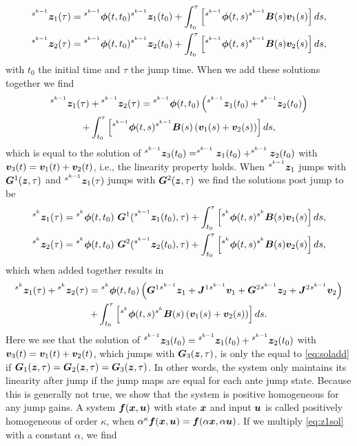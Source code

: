 \documentclass[../DC2017114Bouma.tex]{subfiles}
\begin{document}
\begin{align}
\hspace{0cm}^{s^{k-1}}{\boldsymbol{z}}_1(\tau) &= \hspace{0cm}^{s^{k-1}}\boldsymbol{\phi}(t,t_0)\hspace{0cm}^{s^{k-1}}{\boldsymbol{z}}_1(t_0) + \int_{t_0}^\tau \left[\hspace{0cm}^{s^{k-1}}\boldsymbol{\phi}(t,s)\hspace{0cm}^{s^{k-1}}{\boldsymbol{B}}(s){\boldsymbol{v}}_1(s)\right]ds,\\
\hspace{0cm}^{s^{k-1}}{\boldsymbol{z}}_2(\tau) &= \hspace{0cm}^{s^{k-1}}\boldsymbol{\phi}(t,t_0)\hspace{0cm}^{s^{k-1}}{\boldsymbol{z}}_2(t_0) + \int_{t_0}^\tau \left[\hspace{0cm}^{s^{k-1}}\boldsymbol{\phi}(t,s)\hspace{0cm}^{s^{k-1}}{\boldsymbol{B}}(s){\boldsymbol{v}}_2(s)\right]ds,
\end{align}
with $t_0$ the initial time and $\tau$ the jump time.
When we add these solutions together we find
\begin{multline}
^{s^{k-1}}{\boldsymbol{z}}_1(\tau) + \hspace{0cm}^{s^{k-1}}{\boldsymbol{z}}_2(\tau) = \hspace{0cm}^{s^{k-1}}\boldsymbol{\phi}(t,t_0)\left(\hspace{0cm}^{s^{k-1}}{\boldsymbol{z}}_1(t_0) + \hspace{0cm}^{s^{k-1}}{\boldsymbol{z}}_2(t_0)\right) \\+ \int_{t_0}^\tau \left[\hspace{0cm}^{s^{k-1}}\boldsymbol{\phi}(t,s)\hspace{0cm}^{s^{k-1}}{\boldsymbol{B}}(s)\left({\boldsymbol{v}}_1(s) + {\boldsymbol{v}}_2(s)\right)\right]ds,
\end{multline}
which is equal to the solution of $^{s^{k-1}}{\boldsymbol{z}}_3(t_0) = ^{s^{k-1}}{\boldsymbol{z}}_1(t_0) + ^{s^{k-1}}{\boldsymbol{z}}_2(t_0)$ with ${\boldsymbol{v}}_3(t) = {\boldsymbol{v}}_1(t) + {\boldsymbol{v}}_2(t)$, i.e., the linearity property holds. When $^{s^{k-1}}{\boldsymbol{z}}_1$ jumps with ${\boldsymbol{G}}^1({\boldsymbol{z}},\tau)$ and $^{s^{k-1}}{\boldsymbol{z}}_1(\tau)$ jumps with ${\boldsymbol{G}}^2({\boldsymbol{z}},\tau)$ we find the solutions post jump to be
\begin{align}
^{s^{k}}\zb_1(\tau) &= \ls^{s^{k}}\phib(t,t_0)\ \Gb^1(^{s^{k-1}}\zb_1(t_0),\tau) + \int_{t_0}^\tau \left[\ls^{s^{k}}\phib(t,s)\ls^{s^{k}}\Bb(s)\vb_1(s)\right]ds,\label{eq:z1sol}\\
^{s^{k}}\zb_2(\tau) &= \ls^{s^{k}}\phib(t,t_0)\ \Gb^2(^{s^{k-1}}\zb_2(t_0),\tau) + \int_{t_0}^\tau \left[\ls^{s^{k}}\phib(t,s)\ls^{s^{k}}\Bb(s)\vb_2(s)\right]ds,
\end{align}
which when added together results in
\begin{multline}
^{s^{k}}{\boldsymbol{z}}_1(\tau) + \hspace{0cm}^{s^{k}}{\boldsymbol{z}}_2(\tau) = \hspace{0cm}^{s^{k}}\boldsymbol{\phi}(t,t_0)\left({\boldsymbol{G}}^1 \hspace{0cm}^{s^{k-1}}{\boldsymbol{z}}_1 + {\boldsymbol{J}}^1\hspace{0cm}^{s^{k-1}}{\boldsymbol{v}}_1 + {\boldsymbol{G}}^2 \hspace{0cm}^{s^{k-1}}{\boldsymbol{z}}_2 + {\boldsymbol{J}}^2\hspace{0cm}^{s^{k-1}}{\boldsymbol{v}}_2\right) \\+ \int_{t_0}^\tau \left[\hspace{0cm}^{s^{k}}\boldsymbol{\phi}(t,s)\hspace{0cm}^{s^{k}}{\boldsymbol{B}}(s)\left({\boldsymbol{v}}_1(s) + {\boldsymbol{v}}_2(s)\right)\right]ds.\label{eq:soladd}
\end{multline}
Here we see that the solution of $\hspace{0cm}^{s^{k-1}}{\boldsymbol{z}}_3(t_0) = \hspace{0cm}^{s^{k-1}}{\boldsymbol{z}}_1(t_0) + \hspace{0cm}^{s^{k-1}}{\boldsymbol{z}}_2(t_0)$ with ${\boldsymbol{v}}_3(t) = {\boldsymbol{v}}_1(t) + {\boldsymbol{v}}_2(t)$, which jumps with ${\boldsymbol{G}}_3({\boldsymbol{z}},\tau)$, is only the equal to \eqref{eq:soladd} if ${\boldsymbol{G}}_1({\boldsymbol{z}},\tau) = {\boldsymbol{G}}_2({\boldsymbol{z}},\tau) = {\boldsymbol{G}}_3({\boldsymbol{z}},\tau)$. In other words, the system only maintains its linearity after jump if the jump maps are equal for each ante jump state. Because this is generally not true, we show that the system is positive homogeneous for any jump gains. A system ${\boldsymbol{f}}({\boldsymbol{x}},{\boldsymbol{u}})$ with state ${\boldsymbol{x}}$ and input ${\boldsymbol{u}}$ is called positively homogeneous of order $\kappa$, when $\alpha^{\kappa} {\boldsymbol{f}}({\boldsymbol{x}},{\boldsymbol{u}}) = {\boldsymbol{f}}(\alpha {\boldsymbol{x}}, \alpha {\boldsymbol{u}})$. If we multiply \eqref{eq:z1sol} with a constant $\alpha$, we find
\end{document}
